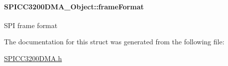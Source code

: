 \paragraph[{frame\+Format}]{ S\+P\+I\+C\+C3200\+D\+M\+A\+\_\+\+Object\+::frame\+Format}\label{struct_s_p_i_c_c3200_d_m_a___object_a0f26d83fb3015a5b297953b364c9ee2e}
S\+P\+I frame format 

The documentation for this struct was generated from the following file\+:\begin{DoxyCompactItemize}
\item 
\hyperlink{_s_p_i_c_c3200_d_m_a_8h}{S\+P\+I\+C\+C3200\+D\+M\+A.\+h}\end{DoxyCompactItemize}
